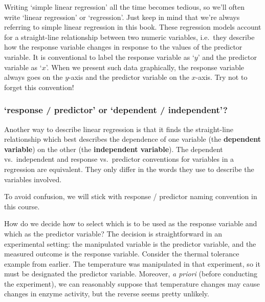 \documentclass[
]{book}
\newenvironment{greybox}{
  \definecolor{shadecolor}{rgb}{0.95,0.95,0.95}  %
  \color{black}
  \begin{shaded}}
 {\end{shaded}}
\newenvironment{infobox}[1]
  {
  \begin{itemize}
  \renewcommand{\labelitemi}{
    \raisebox{-.7\height}[0pt][0pt]{
      {\setkeys{Gin}{width=3em,keepaspectratio}
        \texttt{[image: images/\#1]}}
    }
  }
  \setlength{\fboxsep}{1em}
  \begin{greybox}
  \item
  }
  {
  \end{greybox}
  \end{itemize}
  }
\begin{document}
Writing `simple linear regression' all the time becomes tedious, so we'll often write `linear regression' or `regression'. Just keep in mind that we're always referring to simple linear regression in this book. These regression models account for a straight-line relationship between two numeric variables, i.e.~they describe how the response variable changes in response to the values of the predictor variable. It is conventional to label the response variable as `\(y\)' and the predictor variable as `\(x\)'. When we present such data graphically, the response variable always goes on the \(y\)-axis and the predictor variable on the \(x\)-axis. Try not to forget this convention!

\begin{infobox}{information}

\hypertarget{response-predictor-or-dependent-independent}{%
\subsubsection*{`response / predictor' or `dependent / independent'?}\label{response-predictor-or-dependent-independent}}

Another way to describe linear regression is that it finds the straight-line relationship which best describes the dependence of one variable (the \textbf{dependent variable}) on the other (the \textbf{independent variable}). The dependent vs.~independent and response vs.~predictor conventions for variables in a regression are equivalent. They only differ in the words they use to describe the variables involved.

To avoid confusion, we will stick with response / predictor naming convention in this course.

\end{infobox}

How do we decide how to select which is to be used as the response variable and which as the predictor variable? The decision is straightforward in an experimental setting: the manipulated variable is the predictor variable, and the measured outcome is the response variable. Consider the thermal tolerance example from earlier. The temperature was manipulated in that experiment, so it must be designated the predictor variable. Moreover, \emph{a priori} (before conducting the experiment), we can reasonably suppose that temperature changes may cause changes in enzyme activity, but the reverse seems pretty unlikely.
\end{document}
